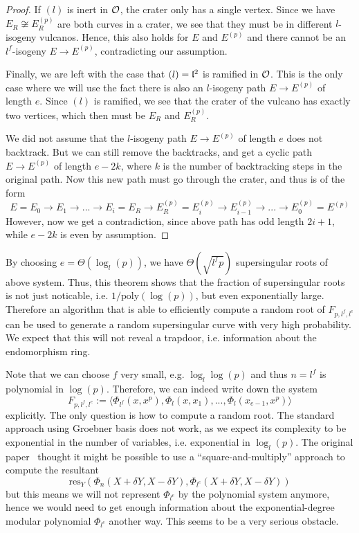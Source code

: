 \begin{proof}
    If $(l)$ is inert in $\mathcal{O}$, the crater only has a single vertex.
    Since we have $E_R \not\cong E_R^{(p)}$ are both curves in a crater, we see that they must be in different $l$-isogeny vulcanos.
    Hence, this also holds for $E$ and $E^{(p)}$ and there cannot be an $l^f$-isogeny $E \to E^{(p)}$, contradicting our assumption.

    Finally, we are left with the case that $(l) = \mathfrak{l}^2$ is ramified in $\mathcal{O}$.
    This is the only case where we will use the fact there is also an $l$-isogeny path $E \to E^{(p)}$ of length $e$.
    Since $(l)$ is ramified, we see that the crater of the vulcano has exactly two vertices, which then must be $E_R$ and $E_R^{(p)}$.

    We did not assume that the $l$-isogeny path $E \to E^{(p)}$ of length $e$ does not backtrack.
    But we can still remove the backtracks, and get a cyclic path $E \to E^{(p)}$ of length $e - 2k$, where $k$ is the number of backtracking steps in the original path.
    Now this new path must go through the crater, and thus is of the form
    \begin{equation*}
        E = E_0 \to E_1 \to ... \to E_i = E_R \to E_R^{(p)} = E_i^{(p)} \to E_{i - 1}^{(p)} \to ... \to E_0^{(p)} = E^{(p)}
    \end{equation*}
    However, now we get a contradiction, since above path has odd length $2i + 1$, while $e - 2k$ is even by assumption.
\end{proof}
By choosing $e = \Theta(\log_l(p))$, we have $\Theta(\sqrt{l^fp})$ supersingular roots of above system.
Thus, this theorem shows that the fraction of supersingular roots is not just noticable, i.e. $1/\mathrm{poly}(\log(p))$, but even exponentially large.
Therefore an algorithm that is able to efficiently compute a random root of $F_{p, l^f, l^e}$ can be used to generate a random supersingular curve with very high probability.
We expect that this will not reveal a trapdoor, i.e. information about the endomorphism ring.

Note that we can choose $f$ very small, e.g. $\log_l\log(p)$ and thus $n = l^f$ is polynomial in $\log(p)$.
Therefore, we can indeed write down the system
\begin{equation*}
    F_{p, l^f, l^e} := \langle \Phi_{l^f}(x, x^p), \Phi_l(x, x_1), ..., \Phi_l(x_{e - 1}, x^p) \rangle
\end{equation*}
explicitly.
The only question is how to compute a random root.
The standard approach using Groebner basis does not work, as we expect its complexity to be exponential in the number of variables, i.e. exponential in $\log_l(p)$.
The original paper~\cite{base_paper} thought it might be possible to use a ``square-and-multiply'' approach to compute the resultant
\begin{equation*}
    \mathrm{res}_Y(\Phi_n(X + \delta Y, X - \delta Y), \Phi_{l^e}(X + \delta Y, X - \delta Y))
\end{equation*} 
but this means we will not represent $\Phi_{l^e}$ by the polynomial system anymore, hence we would need to get enough information about the exponential-degree modular polynomial $\Phi_{l^e}$ another way.
This seems to be a very serious obstacle.

